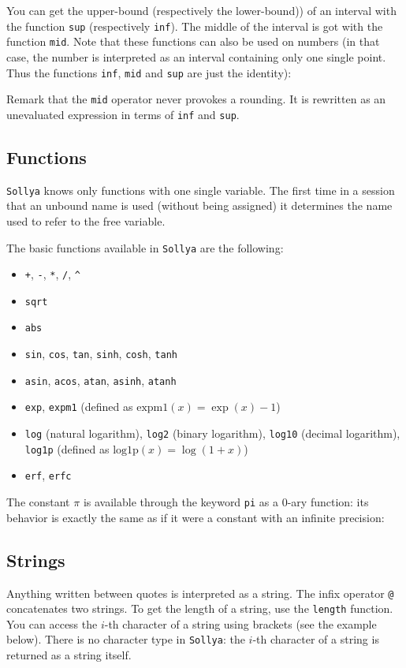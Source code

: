 \documentclass[a4paper]{article}
\newcommand{\com}[1]{\texttt{#1}}
\newcommand{\key}[1]{\texttt{#1}}
\newcommand{\sollya}{\texttt{Sollya}\xspace}
\begin{document}


You can get the upper-bound (respectively the lower-bound)) of an interval with the function \com{sup} (respectively \com{inf}). The middle of the interval is got with the function \com{mid}. Note that these functions can also be used on numbers (in that case, the number is interpreted as an interval containing only one single point. Thus the functions \com{inf}, \com{mid} and \com{sup} are just the identity):



Remark that the \com{mid} operator never provokes a rounding. It is
rewritten as an unevaluated expression in terms of \com{inf} and
\com{sup}.

\subsection{Functions}
\sollya knows only functions with one single variable. The first time in a session that an unbound name is used (without being assigned) it determines the name used to refer to the free variable.

The basic functions available in \sollya are the following:
\begin{itemize}
\item \com{+}, \com{-}, \com{*}, \com{/}, \com{\^{}}
\item \com{sqrt}
\item \com{abs}
\item \com{sin}, \com{cos}, \com{tan}, \com{sinh}, \com{cosh}, \com{tanh}
\item \com{asin}, \com{acos}, \com{atan}, \com{asinh}, \com{atanh}
\item \com{exp}, \com{expm1} (defined as $\mathrm{expm1}(x) = \exp(x)-1$)
\item \com{log} (natural logarithm), \com{log2} (binary logarithm), \com{log10} (decimal logarithm), \com{log1p} (defined as $\mathrm{log1p}(x) = \log(1+x)$)
\item \com{erf}, \com{erfc}
\end{itemize}

The constant $\pi$ is available through the keyword \key{pi} as a $0$-ary function: its behavior is exactly the same as if it were a constant with an infinite precision:



\subsection{Strings}
Anything written between quotes is interpreted as a string. The infix operator \com{@} concatenates two strings. To get the length of a string, use the \com{length} function. You can access the $i$-th character of a string using brackets (see the example below). There is no character type in \sollya: the $i$-th character of a string is returned as a string itself.
\end{document}
